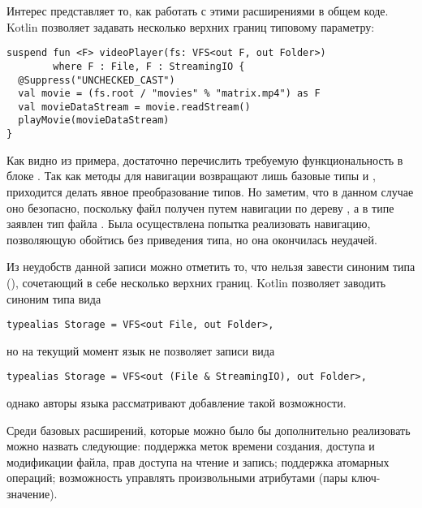     Интерес представляет то, как работать с этими расширениями в общем коде. Kotlin позволяет задавать несколько верхних границ типовому параметру:
    \begin{verbatim}
suspend fun <F> videoPlayer(fs: VFS<out F, out Folder>)
        where F : File, F : StreamingIO {
  @Suppress("UNCHECKED_CAST")
  val movie = (fs.root / "movies" % "matrix.mp4") as F
  val movieDataStream = movie.readStream()
  playMovie(movieDataStream)
}
    \end{verbatim}
    Как видно из примера, достаточно перечислить требуемую функциональность в блоке . Так как методы для навигации возвращают лишь базовые типы  и , приходится делать явное преобразование типов. Но заметим, что в данном случае оно безопасно, поскольку файл  получен путем навигации по дереву , а в типе  заявлен тип файла . Была осуществлена попытка реализовать навигацию, позволяющую обойтись без приведения типа, но она окончилась неудачей.

    Из неудобств данной записи можно отметить то, что нельзя завести синоним типа (), сочетающий в себе несколько верхних границ. Kotlin позволяет заводить синоним типа вида 
    \begin{verbatim}
typealias Storage = VFS<out File, out Folder>,
    \end{verbatim}
    но на текущий момент язык не позволяет записи вида 
    \begin{verbatim}
typealias Storage = VFS<out (File & StreamingIO), out Folder>,
    \end{verbatim}
    однако авторы языка рассматривают\cite{kotlin-intersection-types} добавление такой возможности.

    Среди базовых расширений, которые можно было бы дополнительно реализовать можно назвать следующие: поддержка меток времени создания, доступа и модификации файла, прав доступа на чтение и запись; поддержка атомарных операций; возможность управлять произвольными атрибутами (пары ключ-значение).

